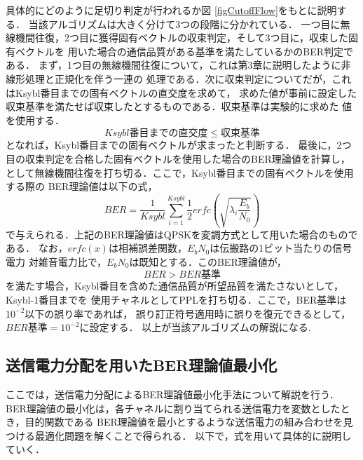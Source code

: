 具体的にどのように足切り判定が行われるか図 \ref{figCutoffFlow}をもとに説明する．
当該アルゴリズムは大きく分けて3つの段階に分かれている．
一つ目に無線機間往復，2つ目に獲得固有ベクトルの収束判定，そして3つ目に，収束した固有ベクトルを
用いた場合の通信品質がある基準を満たしているかのBER判定である．
まず，1つ目の無線機間往復について，これは第3章に説明したように非線形処理と正規化を伴う一連の
処理である．次に収束判定についてだが，これはKsybl番目までの固有ベクトルの直交度を求めて，
求めた値が事前に設定した収束基準を満たせば収束したとするものである．収束基準は実験的に求めた
値を使用する．
\begin{equation}
    Ksybl番目までの直交度 \leq 収束基準
\end{equation}
となれば，Ksybl番目までの固有ベクトルが求まったと判断する．
最後に，2つ目の収束判定を合格した固有ベクトルを使用した場合のBER理論値を計算し，
として無線機間往復を打ち切る．ここで，Ksybl番目までの固有ベクトルを使用する際の
BER理論値は以下の式，
\begin{equation}
    BER = \frac{1}{Ksybl}\sum_{i=1}^{Ksybl} \frac{1}{2}erfc\left( \sqrt{\lambda_i\frac{E_b}{N_0}} \right)
\end{equation}
で与えられる．上記のBER理論値はQPSKを変調方式として用いた場合のものである．
 \cite{akaiwa}なお，$erfc(x)$は相補誤差関数，$E_bN_0$は伝搬路の1ビット当たりの信号電力
対雑音電力比で，$E_bN_0$は既知とする．このBER理論値が，
\begin{equation}
    BER > BER基準
\end{equation}
を満たす場合，Ksybl番目を含めた通信品質が所望品質を満たさないとして，Ksybl-1番目までを
使用チャネルとしてPPLを打ち切る．ここで，BER基準は$10^{-2}$以下の誤り率であれば，
誤り訂正符号適用時に誤りを復元できるとして，$BER基準=10^{-2}$に設定する．
以上が当該アルゴリズムの解説になる.

\subsection{送信電力分配を用いたBER理論値最小化}
ここでは，送信電力分配によるBER理論値最小化手法について解説を行う．
BER理論値の最小化は，各チャネルに割り当てられる送信電力を変数としたとき，目的関数である
BER理論値を最小とするような送信電力の組み合わせを見つける最適化問題を解くことで得られる．
以下で，式を用いて具体的に説明していく．

